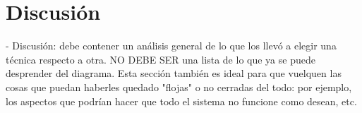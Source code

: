 \section{Discusi\'on}
- Discusión: debe contener un análisis general de lo que los llevó a elegir una técnica respecto a otra. NO DEBE SER una lista de lo que ya se puede desprender del diagrama. Esta sección también es ideal para que vuelquen las cosas que puedan haberles quedado "flojas" o no cerradas del todo: por ejemplo, los aspectos que podrían hacer que todo el sistema no funcione como desean, etc.